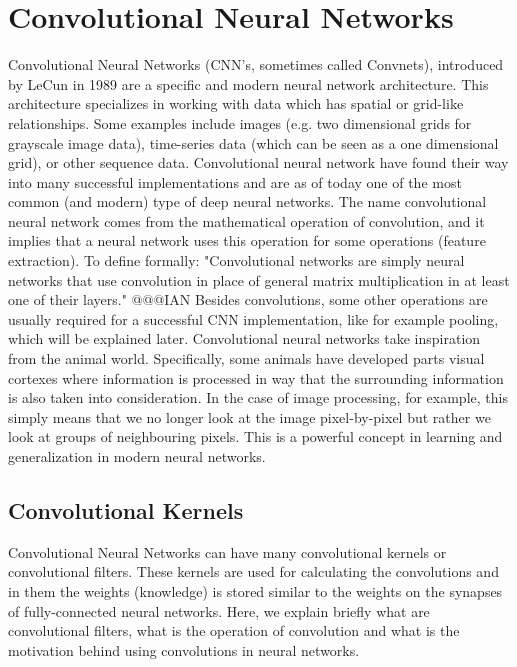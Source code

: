 \documentclass[b5paper]{book}
\begin{document}
\section{Convolutional Neural Networks}

Convolutional Neural Networks (CNN's, sometimes called Convnets), introduced by LeCun in 1989 are a specific and modern neural network architecture. This architecture specializes in working with data which has spatial or grid-like relationships. Some examples include images (e.g. two dimensional grids for grayscale image data), time-series data (which can be seen as a one dimensional grid), or other sequence data. Convolutional neural network have found their way into many successful implementations and are as of today one of the most common (and modern) type of deep neural networks. The name convolutional neural network comes from the mathematical operation of convolution, and it implies that a neural network uses this operation for some operations (feature extraction). To define formally: "Convolutional networks are simply neural networks that use convolution in place of general matrix multiplication in at least one of their layers." @@@IAN Besides convolutions, some other operations are usually required for a successful CNN implementation, like for example pooling, which will be explained later. Convolutional neural networks take inspiration from the animal world. Specifically, some animals have developed parts visual cortexes where information is processed in way that the surrounding information is also taken into consideration. In the case of image processing, for example, this simply means that we no longer look at the image pixel-by-pixel but rather we look at groups of neighbouring pixels. This is a powerful concept in learning and generalization in modern neural networks.

\subsection{Convolutional Kernels}

Convolutional Neural Networks can have many convolutional kernels or convolutional filters. These kernels are used for calculating the convolutions and in them the weights (knowledge) is stored similar to the weights on the synapses of fully-connected neural networks. Here, we explain briefly what are convolutional filters, what is the operation of convolution and what is the motivation behind using convolutions in neural networks.
\end{document}
